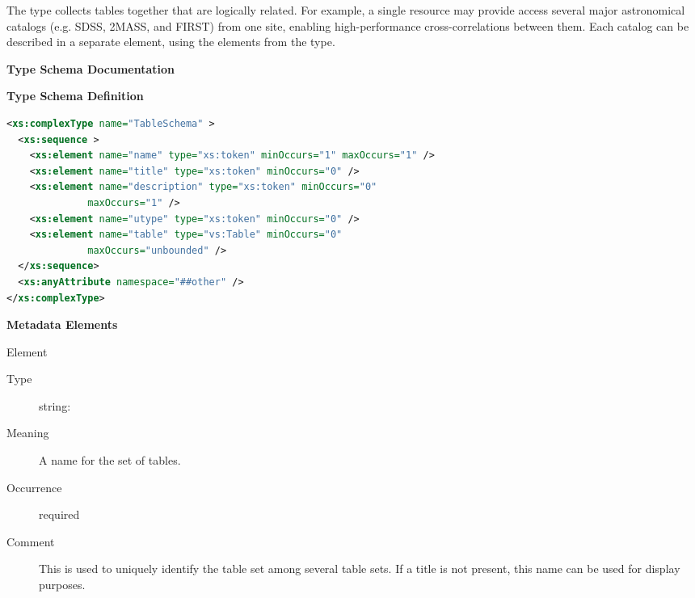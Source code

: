 \documentclass[11pt,a4paper]{ivoa}
\begin{document}


The  type collects
tables together that are logically related.  For example, a single
resource may provide access several major astronomical catalogs
(e.g. SDSS, 2MASS, and FIRST) from one site, enabling high-performance
cross-correlations between them.  Each catalog can be described in a
separate  element, using the elements from
the  type. 



\begin{generated}
\begingroup
      	\renewcommand*\descriptionlabel[1]{%
      	\hbox to 5.5em{\emph{#1}\hfil}}\vspace{2ex}\noindent\textbf{ Type Schema Documentation}


\vspace{1ex}\noindent\textbf{ Type Schema Definition}

\begin{lstlisting}[language=XML,basicstyle=\footnotesize]
<xs:complexType name="TableSchema" >
  <xs:sequence >
    <xs:element name="name" type="xs:token" minOccurs="1" maxOccurs="1" />
    <xs:element name="title" type="xs:token" minOccurs="0" />
    <xs:element name="description" type="xs:token" minOccurs="0"
              maxOccurs="1" />
    <xs:element name="utype" type="xs:token" minOccurs="0" />
    <xs:element name="table" type="vs:Table" minOccurs="0"
              maxOccurs="unbounded" />
  </xs:sequence>
  <xs:anyAttribute namespace="##other" />
</xs:complexType>
\end{lstlisting}

\vspace{0.5ex}\noindent\textbf{ Metadata Elements}

\begingroup\small\begin{bigdescription}\item[Element \xmlel{name}]
\begin{description}
\item[Type] string: 
\item[Meaning] 
               A name for the set of tables.  
             
\item[Occurrence] required
\item[Comment] 
               This is used to uniquely identify the table set among
               several table sets.  If a title is not present, this
               name can be used for display purposes.
             

\end{description}
\end{bigdescription}
\end{generated}
\end{document}
